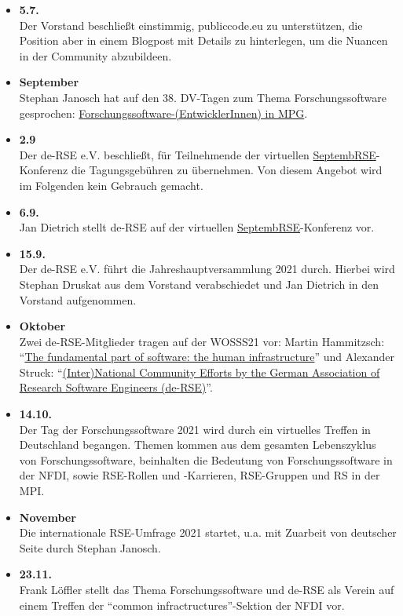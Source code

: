 \begin{itemize}
  \item \textbf{5.7.}\\Der Vorstand beschließt einstimmig, publiccode.eu zu unterstützen, die Position aber in einem Blogpost mit Details zu hinterlegen, um die Nuancen in der Community abzubildeen.
\item \textbf{September}\\Stephan Janosch hat auf den 38. DV-Tagen zum Thema Forschungssoftware gesprochen: \href{https://doi.org/10.6084/m9.figshare.16706374}{Forschungssoftware-(EntwicklerInnen) in MPG}.
\item \textbf{2.9}\\Der de-RSE e.V. beschließt, für Teilnehmende der virtuellen \href{https://septembrse.society-rse.org/}{SeptembRSE}-Konferenz die Tagungsgebühren zu übernehmen. Von diesem Angebot wird im Folgenden kein Gebrauch gemacht.
  \item \textbf{6.9.}\\Jan Dietrich stellt de-RSE auf der virtuellen \href{https://septembrse.society-rse.org/}{SeptembRSE}-Konferenz vor.
 \item \textbf{15.9.}\\Der de-RSE e.V. führt die Jahreshauptversammlung 2021 durch. Hierbei wird Stephan Druskat aus dem Vorstand verabschiedet und Jan Dietrich in den Vorstand aufgenommen.
 \item \textbf{Oktober}\\Zwei de-RSE-Mitglieder tragen auf der WOSSS21 vor: Martin Hammitzsch: ``\href{https://wosss.org/wosss21/S4-MartinHammitzsch}{The fundamental part of software: the human infrastructure}'' und Alexander Struck: ``\href{https://wosss.org/wosss21/S4-AlexanderStruck}{(Inter)National Community Efforts by the German Association of Research Software Engineers (de-RSE)}''.
 \item \textbf{14.10.}\\Der Tag der Forschungssoftware 2021 wird durch ein virtuelles Treffen in Deutschland begangen. Themen kommen aus dem gesamten Lebenszyklus von Forschungssoftware, beinhalten die Bedeutung von Forschungssoftware in der NFDI, sowie RSE-Rollen und -Karrieren, RSE-Gruppen und RS in der MPI.
 \item \textbf{November}\\Die internationale RSE-Umfrage 2021 startet, u.a. mit Zuarbeit von deutscher Seite durch Stephan Janosch.
 \item \textbf{23.11.}\\Frank Löffler stellt das Thema Forschungssoftware und de-RSE als Verein auf einem Treffen der ``common infractructures''-Sektion der NFDI vor.

\end{itemize}
